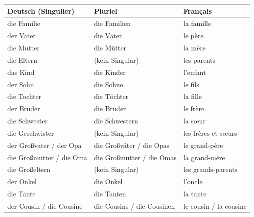 \documentclass[11pt]{article}
\begin{document}
\begin{center}
\begin{tabularx}{\linewidth}{|X|X|X|}
\hline
\rowcolor{popblueL} \textbf{Deutsch (Singulier)} & \textbf{Pluriel} & \textbf{Français} \\
\hline
die Familie & die Familien & la famille \\
der Vater & die Väter & le père \\
die Mutter & die Mütter & la mère \\
die Eltern & (kein Singular) & les parents \\
das Kind & die Kinder & l'enfant \\
der Sohn & die Söhne & le fils \\
die Tochter & die Töchter & la fille \\
der Bruder & die Brüder & le frère \\
die Schwester & die Schwestern & la sœur \\
die Geschwister & (kein Singular) & les frères et sœurs \\
der Großvater / der Opa & die Großväter / die Opas & le grand-père \\
die Großmutter / die Oma & die Großmütter / die Omas & la grand-mère \\
die Großeltern & (kein Singular) & les grands-parents \\
der Onkel & die Onkel & l'oncle \\
die Tante & die Tanten & la tante \\
der Cousin / die Cousine & die Cousins / die Cousinen & le cousin / la cousine \\
\hline
\end{tabularx}
\end{center}

\begin{definition}
\end{definition}
\end{document}
